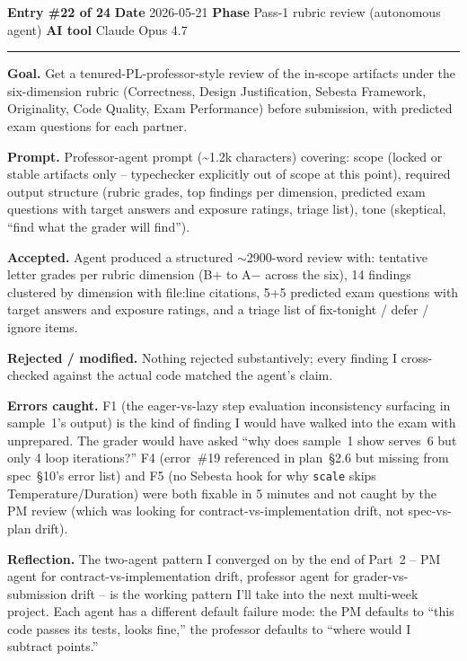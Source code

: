 \documentclass[11pt,a4paper]{article}
\newcommand{\entryheader}[4]{%
    \par\vspace{1em}\noindent\textbf{Entry \#{#1}} \textbullet{} \textbf{Date} #2 \textbullet{} \textbf{Phase} #3 \textbullet{} \textbf{AI tool} #4 \par\vspace{0.3em}\noindent\rule{\textwidth}{0.4pt}\par\vspace{0.3em}}
\newcommand{\field}[1]{\noindent\textbf{#1}}
\begin{document}
\entryheader{22 of 24}{2026-05-21}{Pass-1 rubric review (autonomous agent)}{Claude Opus 4.7}

\field{Goal.} Get a tenured-PL-professor-style review of the
in-scope artifacts under the six-dimension rubric (Correctness, Design
Justification, Sebesta Framework, Originality, Code Quality, Exam
Performance) before submission, with predicted exam questions for each
partner.

\field{Prompt.} Professor-agent prompt (\textasciitilde 1.2k characters)
covering: scope (locked or stable artifacts only -- typechecker
explicitly out of scope at this point), required output structure
(rubric grades, top findings per dimension, predicted exam questions
with target answers and exposure ratings, triage list), tone
(skeptical, ``find what the grader will find'').

\field{Accepted.} Agent produced a structured $\sim$2900-word review
with: tentative letter grades per rubric dimension (B+ to A$-$ across
the six), 14 findings clustered by dimension with file:line
citations, 5+5 predicted exam questions with target answers and
exposure ratings, and a triage list of fix-tonight / defer / ignore
items.

\field{Rejected / modified.} Nothing rejected substantively; every
finding I cross-checked against the actual code matched the agent's
claim.

\field{Errors caught.} F1 (the eager-vs-lazy step evaluation
inconsistency surfacing in sample~1's output) is the kind of finding I
would have walked into the exam with unprepared. The grader would have
asked ``why does sample~1 show serves~6 but only 4 loop iterations?''
F4 (error~\#19 referenced in plan~\S2.6 but missing from spec~\S10's
error list) and F5 (no Sebesta hook for why \texttt{scale} skips
Temperature/Duration) were both fixable in 5 minutes and not caught by
the PM review (which was looking for contract-vs-implementation drift,
not spec-vs-plan drift).

\field{Reflection.} The two-agent pattern I converged on by the end of
Part~2 -- PM agent for contract-vs-implementation drift, professor
agent for grader-vs-submission drift -- is the working pattern I'll
take into the next multi-week project. Each agent has a different
default failure mode: the PM defaults to ``this code passes its tests,
looks fine,'' the professor defaults to ``where would I subtract
points.''
\end{document}
